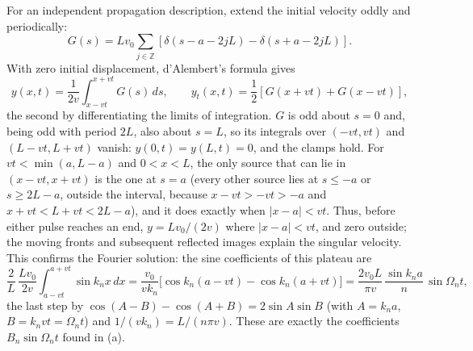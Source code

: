 For an independent propagation description, extend the initial velocity
oddly and periodically:
\[
G(s)=Lv_0\sum_{j\in\mathbb Z}
[\delta(s-a-2jL)-\delta(s+a-2jL)].
\]
With zero initial displacement, d'Alembert's formula gives
\[
y(x,t)=\frac1{2v}\int_{x-vt}^{x+vt}G(s)\,ds,
\qquad y_t(x,t)=\frac12[G(x+vt)+G(x-vt)],
\]
the second by differentiating the limits of integration. $G$ is odd
about $s=0$ and, being odd with period $2L$, also about $s=L$, so its
integrals over $(-vt,vt)$ and $(L-vt,L+vt)$ vanish: $y(0,t)=y(L,t)=0$,
and the clamps hold. For $vt<\min(a,L-a)$ and $0<x<L$, the only source
that can lie in $(x-vt,x+vt)$ is the one at $s=a$ (every other source
lies at $s\le-a$ or $s\ge2L-a$, outside the interval, because
$x-vt>-vt>-a$ and $x+vt<L+vt<2L-a$), and it does exactly
when $|x-a|<vt$. Thus, before either pulse reaches an end,
$y=Lv_0/(2v)$ where $|x-a|<vt$, and zero outside; the moving fronts and
subsequent reflected images explain the singular velocity. This
confirms the Fourier solution: the sine coefficients of this plateau are
\[
\frac2L\,\frac{Lv_0}{2v}\int_{a-vt}^{a+vt}\sin k_nx\,dx
=\frac{v_0}{vk_n}\bigl[\cos k_n(a-vt)-\cos k_n(a+vt)\bigr]
=\frac{2v_0L}{\pi v}\,\frac{\sin k_na}{n}\,\sin\Omega_nt,
\]
the last step by $\cos(A-B)-\cos(A+B)=2\sin A\sin B$ (with $A=k_na$,
$B=k_nvt=\Omega_nt$) and $1/(vk_n)=L/(n\pi v)$. These are exactly the
coefficients $B_n\sin\Omega_nt$ found in (a).

